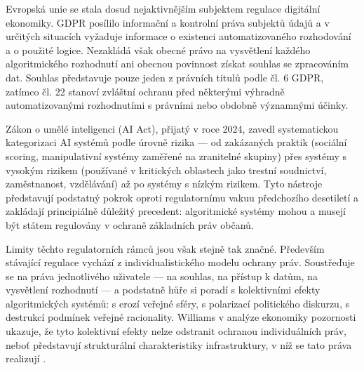 Evropská unie se stala dosud nejaktivnějším subjektem regulace digitální ekonomiky.
GDPR posílilo informační a kontrolní práva subjektů údajů a v určitých situacích vyžaduje informace o existenci automatizovaného rozhodování a o použité logice. Nezakládá však obecné právo na vysvětlení každého algoritmického rozhodnutí ani obecnou povinnost získat souhlas se zpracováním dat. Souhlas představuje pouze jeden z právních titulů podle čl. 6 GDPR, zatímco čl. 22 stanoví zvláštní ochranu před některými výhradně automatizovanými rozhodnutími s právními nebo obdobně významnými účinky.

Zákon o umělé inteligenci (AI Act), přijatý v roce 2024, zavedl systematickou kategorizaci AI systémů podle úrovně rizika — od zakázaných praktik (sociální scoring, manipulativní systémy zaměřené na zranitelné skupiny) přes systémy s vysokým rizikem (používané v kritických oblastech jako trestní soudnictví, zaměstnanost, vzdělávání) až po systémy s nízkým rizikem. Tyto nástroje představují podstatný pokrok oproti regulatornímu vakuu předchozího desetiletí a zakládají principiálně důležitý precedent: algoritmické systémy mohou a musejí být státem regulovány v ochraně základních práv občanů.

Limity těchto regulatorních rámců jsou však stejně tak značné. Především stávající regulace vychází z individualistického modelu ochrany práv. Soustřeďuje se na práva jednotlivého uživatele — na souhlas, na přístup k datům, na vysvětlení rozhodnutí — a podstatně hůře si poradí s kolektivními efekty algoritmických systémů: s erozí veřejné sféry, s polarizací politického diskurzu, s destrukcí podmínek veřejné racionality. Williams v analýze ekonomiky pozornosti ukazuje, že tyto kolektivní efekty nelze odstranit ochranou individuálních práv, neboť představují strukturální charakteristiky infrastruktury, v níž se tato práva realizují \parencite{Williams18}.


